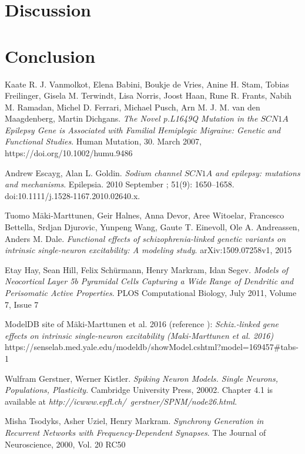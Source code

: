 \documentclass[twocolumn, a4paper,10pt, norsk]{scrartcl}
\begin{document}
\section*{Discussion}

\section*{Conclusion}


\begin{thebibliography}{9}
Kaate R. J. Vanmolkot, Elena Babini, Boukje de Vries, Anine H. Stam, Tobias Freilinger, Gisela M. Terwindt, Lisa Norris, Joost Haan, Rune R. Frants, Nabih M. Ramadan, Michel D. Ferrari, Michael Pusch, Arn M. J. M. van den Maagdenberg, Martin Dichgans.
\textit{The Novel p.L1649Q Mutation in the $SCN1A$ Epilepsy Gene is Associated with Familial Hemiplegic Migraine: Genetic and Functional Studies}. 
Human Mutation, 30. March 2007,
https://doi.org/10.1002/humu.9486

Andrew Escayg, Alan L. Goldin.
\textit{Sodium channel $SCN1A$ and epilepsy: mutations and mechanisms}. 
Epilepsia. 2010 September ; 51(9): 1650–1658. doi:10.1111/j.1528-1167.2010.02640.x.

Tuomo M\"aki-Marttunen, Geir Halnes, Anna Devor, Aree Witoelar, Francesco Bettella, Srdjan Djurovic, Yunpeng Wang, Gaute T. Einevoll, Ole A. Andreassen, Anders M. Dale.
\textit{Functional effects of schizophrenia-linked genetic variants on intrinsic single-neuron excitability: A modeling study}. 
arXiv:1509.07258v1, 2015

Etay Hay, Sean Hill, Felix Sch\"urmann, Henry Markram, Idan Segev.
\textit{Models of Neocortical Layer 5b Pyramidal Cells Capturing a Wide Range of Dendritic and Perisomatic Active Properties}. 
PLOS Computational Biology, July 2011, Volume 7, Issue 7


ModelDB site of M\"aki-Marttunen et al. 2016 (reference \cite{gautes}):
\textit{Schiz.-linked gene effects on intrinsic single-neuron excitability (Maki-Marttunen et al. 2016)}
https://senselab.med.yale.edu/modeldb/showModel.cshtml?model=169457\#tabs-1


Wulfram Gerstner, Werner Kistler.
\textit{Spiking Neuron Models. Single Neurons, Populations, Plasticity}.
Cambridge University Press, 20002.
Chapter 4.1 is available at \textit{http://icwww.epfl.ch/~gerstner/SPNM/node26.html}.



Misha Tsodyks, Asher Uziel, Henry Markram.
\textit{Synchrony Generation in Recurrent Networks with Frequency-Dependent Synapses}.
The Journal of Neuroscience, 2000, Vol. 20 RC50


\end{thebibliography}
\end{document}
